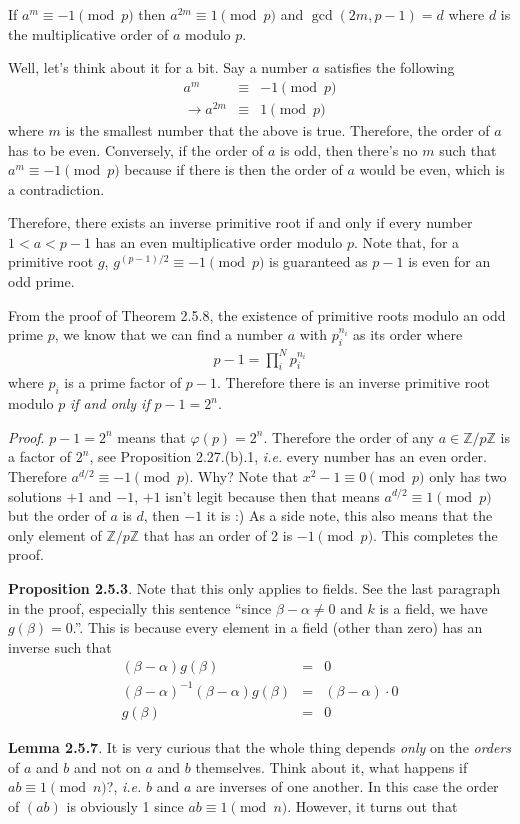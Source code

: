 \documentclass[aps,preprint,preprintnumbers,nofootinbib,showpacs,prd]{revtex4-1}
\newcommand{\ie}{{\it i.e.} }
\newcommand{\nbea}{\begin{eqnarray*}}
\newcommand{\neea}{\end{eqnarray*}}
\begin{document}
If $a^m \equiv -1 \pmod{p}$ then $a^{2m} \equiv 1 \pmod{p}$ and $\gcd(2m, p-1) = d$ where $d$ is the multiplicative order of $a$ modulo $p$. 

Well, let's think about it for a bit. Say a number $a$ satisfies the following
%
\nbea
a^m & \equiv & -1 \pmod{p} \\
\to a^{2m} & \equiv & 1 \pmod{p}
\neea
%
where $m$ is the smallest number that the above is true. Therefore, the order of $a$ has to be even. Conversely, if the order of $a$ is odd, then there's no $m$ such that $a^m \equiv -1 \pmod{p}$ because if there is then the order of $a$ would be even, which is a contradiction.

Therefore, there exists an inverse primitive root if and only if every number $1 < a < p-1$ has an even multiplicative order modulo $p$. Note that, for a primitive root $g$, $g^{(p-1)/2} \equiv -1 \pmod{p}$ is guaranteed as $p-1$ is even for an odd prime.

From the proof of Theorem 2.5.8, the existence of primitive roots modulo an odd prime $p$, we know that we can find a number $a$ with $p_i^{n_i}$ as its order where
%
\nbea
p-1 = \prod_i^{N} p_i^{n_i}
\neea
%
where $p_i$ is a prime factor of $p-1$. Therefore there is an inverse primitive root modulo $p$ {\it if and only if} $p-1 = 2^n$.

{\it Proof}. $p-1 = 2^n$ means that $\varphi(p) = 2^n$. Therefore the order of any $a \in \mathbb{Z}/p\mathbb{Z}$ is a factor of $2^n$, see Proposition 2.27.(b).1, \ie every number has an even order.  Therefore $a^{d/2} \equiv -1 \pmod{p}$. Why? Note that $x^2 - 1 \equiv 0 \pmod{p}$ only has two solutions $+1$ and $-1$, $+1$ isn't legit because then that means $a^{d/2} \equiv 1 \pmod{p}$ but the order of $a$ is $d$, then $-1$ it is :) As a side note, this also means that the only element of $\mathbb{Z}/p\mathbb{Z}$ that has an order of 2 is $-1 \pmod{p}$. This completes the proof.

{\bf Proposition 2.5.3}. Note that this only applies to fields. See the last paragraph in the proof, especially this sentence ``since $\beta-\alpha \neq 0$ and $k$ is a field, we have $g(\beta)=0$.''. This is because every element in a field (other than zero) has an inverse such that
%
\nbea
(\beta - \alpha)g(\beta) & = & 0 \\
(\beta - \alpha)^{-1}(\beta - \alpha)g(\beta) & = & (\beta - \alpha) \cdot 0 \\
g(\beta) & = & 0
\neea
%

{\bf Lemma 2.5.7}. It is very curious that the whole thing depends {\it only} on the {\it orders} of $a$ and $b$ and not on $a$ and $b$ themselves. Think about it, what happens if $ab \equiv 1 \pmod{n}$?, \ie $b$ and $a$ are inverses of one another. In this case the order of $(ab)$ is obviously 1 since $ab \equiv 1 \pmod{n}$. However, it turns out that
\end{document}
